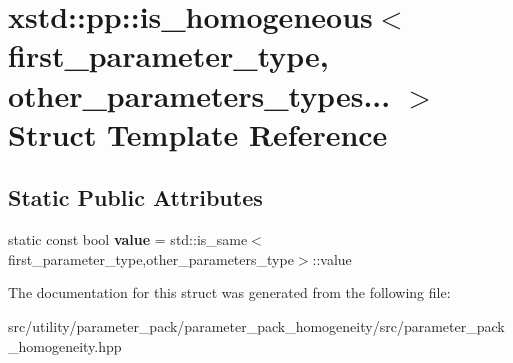 \hypertarget{structxstd_1_1pp_1_1is__homogeneous_3_01first__parameter__type_00_01other__parameters__types_8_8_8_01_4}{\section{xstd\-:\-:pp\-:\-:is\-\_\-homogeneous$<$ first\-\_\-parameter\-\_\-type, other\-\_\-parameters\-\_\-types... $>$ Struct Template Reference}
\label{structxstd_1_1pp_1_1is__homogeneous_3_01first__parameter__type_00_01other__parameters__types_8_8_8_01_4}
}
\subsection*{Static Public Attributes}
\begin{DoxyCompactItemize}
\item 
\hypertarget{structxstd_1_1pp_1_1is__homogeneous_3_01first__parameter__type_00_01other__parameters__types_8_8_8_01_4_a7cb56d449b90e1ffbc9e9332d1faaa94}{static const bool {\bfseries value} = std\-::is\-\_\-same$<$first\-\_\-parameter\-\_\-type,other\-\_\-parameters\-\_\-type$>$\-::value}\label{structxstd_1_1pp_1_1is__homogeneous_3_01first__parameter__type_00_01other__parameters__types_8_8_8_01_4_a7cb56d449b90e1ffbc9e9332d1faaa94}

\end{DoxyCompactItemize}


The documentation for this struct was generated from the following file\-:\begin{DoxyCompactItemize}
\item 
src/utility/parameter\-\_\-pack/parameter\-\_\-pack\-\_\-homogeneity/src/parameter\-\_\-pack\-\_\-homogeneity.\-hpp\end{DoxyCompactItemize}
